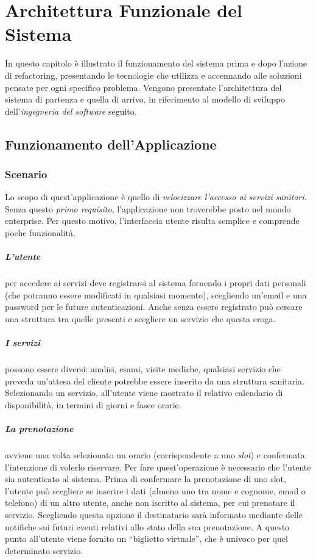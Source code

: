 \chapter{Architettura Funzionale del Sistema}
\label{chap:systemdesign}
In questo capitolo è illustrato il funzionamento del sistema prima e dopo l'azione di refactoring, presentando le tecnologie che utilizza e accennando alle soluzioni pensate per ogni specifico problema. Vengono presentate l'architettura del sistema di partenza e quella di arrivo, in riferimento al modello di sviluppo dell'\emph{ingegneria del software} seguito.
\section{Funzionamento dell'Applicazione}
\subsection{Scenario}
Lo scopo di quest'applicazione è quello di \textit{velocizzare l'accesso ai servizi sanitari}. Senza questo \textit{primo requisito}, l'applicazione non troverebbe posto nel mondo enterprise. Per questo motivo, l'interfaccia utente risulta semplice e comprende poche funzionalità. 
\paragraph{L'utente} per accedere ai servizi deve registrarsi al sistema fornendo i propri dati personali (che potranno essere modificati in qualsiasi momento), scegliendo un'email e una password per le future autenticazioni. Anche senza essere registrato può cercare una struttura tra quelle presenti e scegliere un servizio che questa eroga. 
\paragraph{I servizi} possono essere diversi: analisi, esami, visite mediche, qualsiasi servizio che preveda un'attesa del cliente potrebbe essere inserito da una struttura sanitaria. Selezionando un servizio, all'utente viene mostrato il relativo calendario di disponibilità, in termini di giorni e fasce orarie. 
\paragraph{La prenotazione} avviene una volta selezionato un orario (corrispondente a uno \emph{slot}) e confermata l'intenzione di volerlo riservare. Per fare quest'operazione è necessario che l'utente sia autenticato al sistema. Prima di confermare la prenotazione di uno slot, l'utente può scegliere se inserire i dati (almeno uno tra nome e cognome, email o telefono) di un altro utente, anche non iscritto al sistema, per cui prenotare il servizio. Scegliendo questa opzione il destinatario sarà informato mediante delle notifiche sui futuri eventi relativi allo stato della sua prenotazione. A questo punto all'utente viene fornito un ``biglietto virtuale'', che è univoco per quel determinato servizio.
